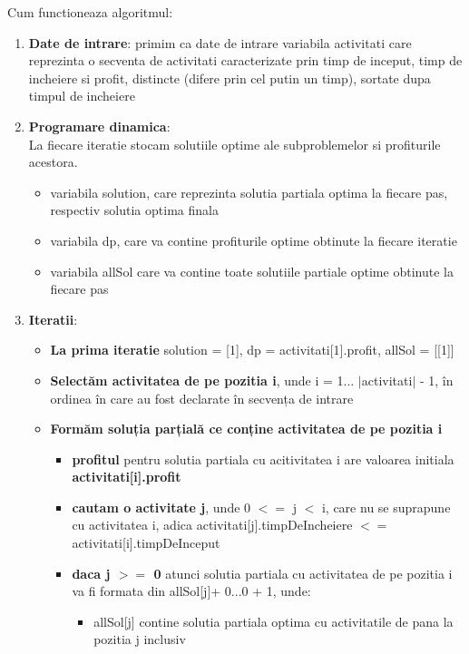 Cum functioneaza algoritmul:
\begin{enumerate}
    \item \textbf{Date de intrare}: primim ca date de intrare variabila activitati care reprezinta o secventa de activitati caracterizate prin timp de inceput, timp de incheiere si profit,  distincte (difere prin cel putin un timp), sortate dupa timpul de incheiere
    \item \textbf{Programare dinamica}: \\
    La fiecare iteratie stocam solutiile optime ale subproblemelor si profiturile acestora.
    \begin{itemize}
        \item variabila solution, care reprezinta solutia partiala optima la fiecare pas, respectiv solutia optima finala 
        \item variabila dp, care va contine profiturile optime obtinute la fiecare iteratie
        \item  variabila allSol care va contine toate solutiile partiale optime obtinute la fiecare pas
    \end{itemize} 
    \item \textbf{Iteratii}: 
    \begin{itemize}
        \item \textbf{La prima iteratie} solution = [1], dp = activitati[1].profit, allSol = [[1]] 
        \item \textbf{Selectăm activitatea de pe pozitia i}, unde i = 1... $|$activitati$|$ - 1, în ordinea în care au fost declarate în secvența de intrare
        \item \textbf{Formăm soluția parțială ce conține activitatea de pe pozitia i}
        \begin{itemize}
            \item \textbf{profitul} pentru solutia partiala cu acitivitatea i are valoarea initiala \textbf{activitati[i].profit}
            \item \textbf{cautam o activitate j}, unde 0 $<$$=$ j $<$ i, care nu se suprapune cu activitatea i, adica activitati[j].timpDeIncheiere $<$$=$activitati[i].timpDeInceput
            \item \textbf{daca j $>$$=$ 0} atunci solutia partiala cu activitatea de pe pozitia i va fi formata din 
            allSol[j]+ 0...0 + 1, unde:
            \begin{itemize}
                \item allSol[j] contine solutia partiala optima cu activitatile de pana la pozitia j inclusiv

\end{itemize}
\end{itemize}
\end{itemize}
\end{enumerate}
